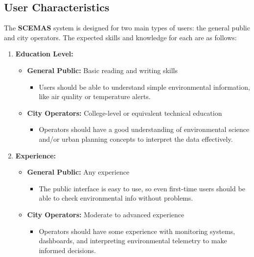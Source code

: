 {\subsection{User Characteristics}
\label{sub:user_characteristics}
The {\bf SCEMAS} system is designed for two main types of users: the general public and city operators. The expected skills and knowledge for each are as follows:

\begin{enumerate}
    \item \textbf{Education Level:}
    \begin{itemize}
        \item \textbf{General Public:} Basic reading and writing skills
        \begin{itemize}
            \item Users should be able to understand simple environmental information, like air quality or temperature alerts.
        \end{itemize}
        \item \textbf{City Operators:} College-level or equivalent technical education
        \begin{itemize}
            \item Operators should have a good understanding of environmental science and/or urban planning concepts to interpret the data effectively.
        \end{itemize}
    \end{itemize}
    
    \item \textbf{Experience:}
    \begin{itemize}
        \item \textbf{General Public:} Any experience
        \begin{itemize}
            \item The public interface is easy to use, so even first-time users should be able to check environmental info without problems.
        \end{itemize}
        \item \textbf{City Operators:} Moderate to advanced experience
        \begin{itemize}
            \item Operators should have some experience with monitoring systems, dashboards, and interpreting environmental telemetry to make informed decisions.
        \end{itemize}
    \end{itemize}
    

\end{enumerate}}
